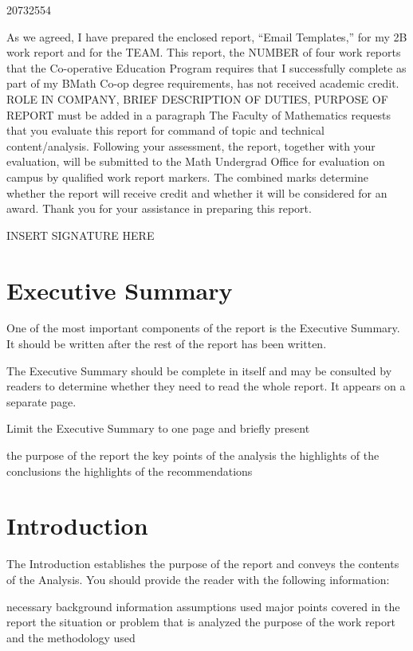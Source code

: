 \documentclass{article}
\newcommand{\term}{2B } %
\newcommand{\WTT}{Email Templates}
\begin{document}
 {20732554}

\newpage


As we agreed, I have prepared the enclosed report, “\WTT,” for
my \term work report and for the TEAM. This
report, the NUMBER of four work reports that the Co-operative Education Program
requires that I successfully complete as part of my BMath Co-op degree
requirements, has not received academic credit.
\vskip 10pt
ROLE IN COMPANY, BRIEF DESCRIPTION OF DUTIES, PURPOSE OF REPORT must be added in a paragraph
\vskip 10pt 
The Faculty of Mathematics requests that you evaluate this report for command
of topic and technical content/analysis. Following your assessment, the report,
together with your evaluation, will be submitted to the Math Undergrad Office
for evaluation on campus by qualified work report markers. The combined
marks determine whether the report will receive credit and whether it will be
considered for an award.
Thank you for your assistance in preparing this report.

INSERT SIGNATURE HERE
\newpage

\header 
\tableofcontents
\listoffigures

\newpage
\section*{Executive Summary}
One of the most important components of the report is the Executive Summary. It should be written after the rest of the report has been written.

The Executive Summary should be complete in itself and may be consulted by readers to determine whether they need to read the whole report. It appears on a separate page.

Limit the Executive Summary to one page and briefly present

the purpose of the report
the key points of the analysis
the highlights of the conclusions
the highlights of the recommendations
\newpage
{}
\section{Introduction}
The Introduction establishes the purpose of the report and conveys the contents of the Analysis. You should provide the reader with the following information:

necessary background information
assumptions used
major points covered in the report
the situation or problem that is analyzed
the purpose of the work report and the methodology used
\end{document}
